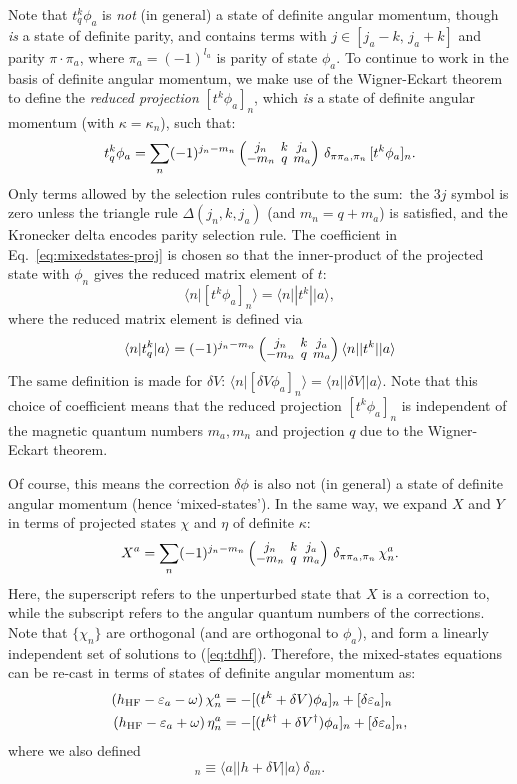 \documentclass[10pt,twocolumn,a4paper]{article}%
\newcommand{\bra}[1]{\ensuremath{\langle #1|}}	%
\newcommand{\ket}[1]{\ensuremath{|#1\rangle}}
\newcommand{\braket}[1]{\ensuremath{\langle #1\rangle}}	%
\newcommand{\threej}[6]{
\renewcommand\arraystretch{0.75}\setlength\arraycolsep{2pt}
\small\ensuremath{\begin{pmatrix}#1&#2&#3\\#4&#5&#6\end{pmatrix}}
}	%
\newcommand{\be}{\begin{equation}}
\newcommand{\ee}{\end{equation}}
\def\en{\ensuremath{\varepsilon}}
\renewcommand{\k}{\ensuremath{\kappa}}
\newcommand{\w}{\ensuremath{\omega}}
\begin{document}
Note that ${t^k_q}\phi_a$ is {\em not} (in general) a state of definite angular momentum, though {\em is} a state of definite parity, and contains terms with $j\in[j_a-k,\,j_a+k]$ and parity $\pi\cdot\pi_a$, where $\pi_a=(-1)^{l_a}$ is parity of state $\phi_a$.
To continue to work in the basis of definite angular momentum, we make use of the Wigner-Eckart theorem to define the {\em reduced projection} $[t^k\phi_a]_n$, which {\em is} a state of definite angular momentum (with $\kappa=\kappa_n$), such that:
\be\label{eq:mixedstates-proj}
{t^k_q}\phi_a = \sum_n(-1)^{j_n-m_n}\threej{j_n}{k}{j_a}{-m_n}{q}{m_a}
\, \delta_{\pi\pi_a,\pi_n}\,
[{t^k\phi_a}]_n . 
\ee
Only terms allowed by the selection rules contribute to the sum:\ the 3$j$ symbol is zero unless the triangle rule  $\Delta(j_n,k,j_a)$ (and $m_n=q+m_a$) is satisfied, and the Kronecker delta encodes parity selection rule.
The coefficient in Eq.~\eqref{eq:mixedstates-proj} is chosen so that the inner-product of the projected state with $\phi_n$ gives the reduced matrix element of $t$:
\be
\braket{n|[{t^k\phi_a}]_n} = \bra{n}|t^k|\ket{a},
\ee
where the reduced matrix element is defined via
\be
\bra{n}t^k_q\ket{a} = (-1)^{j_n-m_n}\threej{j_n}{k}{j_a}{-m_n}{q}{m_a}\bra{n}|t^k|\ket{a}
\ee
The same definition is made for $\delta V$:
$
\braket{n|[{\delta V\phi_a}]_n} = \bra{n}|\delta V|\ket{a}.
$
Note that this choice of coefficient means that the reduced projection $[{t^k\phi_a}]_n$ is independent of the magnetic quantum numbers $m_a,m_n$ and projection $q$ due to the Wigner-Eckart theorem.

Of course, this means the correction $\delta\phi$ is also not (in general) a state of definite angular momentum (hence `mixed-states').
In the same way, we expand $X$ and $Y$ in terms of projected states $\chi$ and $\eta$ of definite $\k$:
\begin{equation}
\label{eq:dPsi-pw}
X^{a} = \sum_{n}(-1)^{j_n-m_n}\threej{j_n}{k}{j_a}{-m_n}{q}{m_a}
\, \delta_{\pi\pi_a,\pi_n}\,
\chi^a_{n}.
\end{equation}
Here, the superscript refers to the unperturbed state that $X$ is a correction to, while the subscript refers to the angular quantum numbers of the corrections.
Note that $\{\chi_n\}$ are orthogonal (and are orthogonal to $\phi_a$), and form a linearly independent set of solutions to (\ref{eq:tdhf}).
Therefore, the mixed-states equations can be re-cast in terms of states of definite angular momentum as:
\begin{align}
\left( h_{\rm HF} - \en_a -\w \right)\chi^a_n &= -[(t^k+\delta V)\phi_a]_n + [\delta\en_a]_n\\
\left( h_{\rm HF} - \en_a +\w \right)\eta^a_n &= -[(t^{k\dag}+\delta V^\dag)\phi_a]_n + [\delta\en_a]_n,
\end{align}
where we also defined
\be
[\delta\en_a]_n\equiv\bra{a}|h+\delta V|\ket{a}\,\delta_{an}.
\ee
\end{document}
